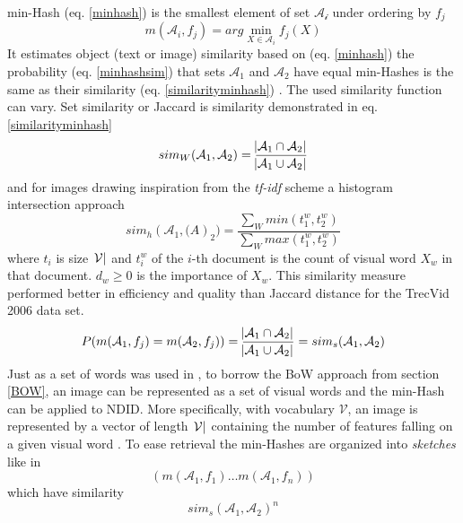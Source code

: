 \documentclass[english,12pt,a4paper,pdftex,elec,utf8, table]{aaltothesis}
\begin{document}
min-Hash (eq. \ref{minhash}) is the smallest element of set $\mathcal{A_i}$ under ordering by $f_j$
\begin{equation}\label{minhash}
m(\mathcal{A}_i,f_j)= arg \min_{X \in \mathcal{A}_i}f_j(X)
\end{equation}
It estimates object (text or image) similarity based on (eq. \ref{minhash}) the probability (eq. \ref{minhashsim}) that sets $\mathcal{A}_1$ and $\mathcal{A}_2$ have equal min-Hashes is the same as their similarity (eq. \ref{similarityminhash}) \cite{Chum2008}. The used similarity function can vary. Set similarity or Jaccard is similarity demonstrated in eq. \ref{similarityminhash}
\begin{equation}\label{similarityminhash}
sim_W(\mathcal{A}_1,\mathcal{A}_2) = \frac{\abs{\mathcal{A}_1 \cap \mathcal{A}_2}}{\abs{\mathcal{A}_1 \cup \mathcal{A}_2}}
\end{equation}
 and for images drawing inspiration from the \emph{tf-idf} scheme a histogram intersection approach
\begin{equation}\label{similarityminhashimages}
sim_h(\mathcal{A}_1, \mathcal(A)_2)=\frac{\sum_W min(t^w_1,t^w_2)}{\sum_W max(t^w_1,t^w_2)}
\end{equation}
where $t_i$ is size $\abs{\mathcal{V}}$ and $t_i^w$ of the $i$-th document is the count of visual word $X_w$ in that document. $d_w \geq 0$ is the importance of $X_w$. This similarity measure performed better in efficiency and quality than Jaccard distance for the TrecVid 2006 data set. \cite{Chum2008}
\begin{equation}\label{minhashsim}
P(m(\mathcal{A}_1,f_j) = m(\mathcal{A}_2,f_j)) = \frac{\abs{\mathcal{A}_1 \cap \mathcal{A}_2}}{\abs{\mathcal{A}_1 \cup \mathcal{A}_2}} = sim_s(\mathcal{A}_1, \mathcal{A}_2)
\end{equation}
Just as a set of words was used in \cite{Broder1997}, to borrow the BoW approach from section \ref{BOW}, an image can be represented as a set of visual words and the min-Hash can be applied to NDID. More specifically, with vocabulary $\mathcal{V}$, an image is represented by a vector of length $\abs{\mathcal{V}}$ containing the number of features falling on a given visual word \cite{Chum2008}.
To ease retrieval the min-Hashes are organized into \emph{sketches} like in \cite{Broder1997}
\begin{equation}\label{sketch}
(m(\mathcal{A_1},f_1) \ldots m(\mathcal{A_1},f_n))
\end{equation}
which have similarity
\begin{equation}\label{sketchsim}
sim_s(\mathcal{A}_1, \mathcal{A}_2)^n
\end{equation}
\end{document}
